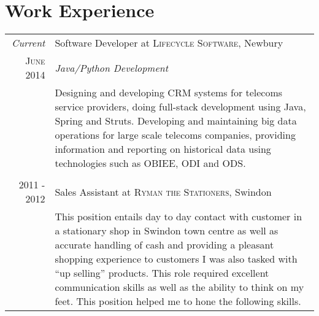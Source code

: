 \section{Work Experience}
\begin{tabular}{r|p{11cm}}

	\emph{Current} & Software Developer at \textsc{Lifecycle Software}, Newbury \\
	\textsc{June 2014}&\emph{Java/Python Development} \\
	&\footnotesize{Designing and developing CRM systems for telecoms service providers, doing full-stack development using Java, Spring and Struts. Developing and maintaining big data operations for large scale telecoms companies, providing information and reporting on historical data using technologies such as OBIEE, ODI and ODS.} \\

	\multicolumn{2}{c}{} \\

	\textsc{2011 - 2012} & Sales Assistant at \textsc{Ryman the Stationers}, Swindon \\
	&\footnotesize{This position entails day to day contact with customer in a stationary shop in Swindon town centre as well as accurate handling of cash and providing a pleasant shopping experience to customers I was also tasked with “up selling” products. This role required excellent communication skills as well as the ability to think on my feet. This position helped me to hone the following skills.} \\

\end{tabular}